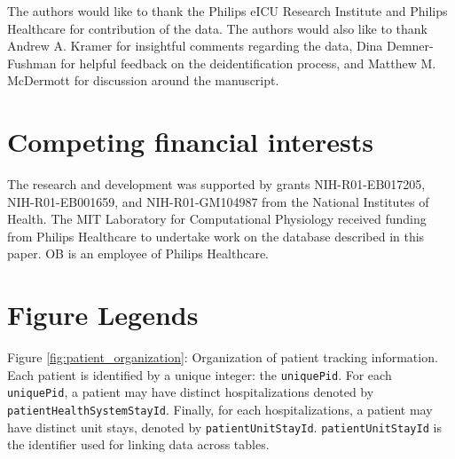 \documentclass[english]{article}
\newcommand{\colname}[1]{\texttt{#1}}
\begin{document}
The authors would like to thank the Philips eICU Research Institute and
Philips Healthcare for contribution of the data. The authors would also like to thank Andrew A. Kramer for insightful comments regarding the data, Dina Demner-Fushman for helpful feedback on the deidentification process, and Matthew M. McDermott for discussion around the manuscript.

\section*{Competing financial interests}\label{competing-interests}

The research and development was supported by grants NIH-R01-EB017205, NIH-R01-EB001659, and NIH-R01-GM104987 from the National Institutes of Health. The MIT Laboratory for Computational Physiology received funding from Philips Healthcare to undertake work on the database described in this paper. OB is an employee of Philips Healthcare.

\section*{Figure Legends}



\noindent
Figure \ref{fig:patient_organization}: Organization of patient tracking information. Each patient is identified by a unique integer: the \colname{uniquePid}. For each \colname{uniquePid}, a patient may have distinct hospitalizations denoted by \colname{patientHealthSystemStayId}. Finally, for each hospitalizations, a patient may have distinct unit stays, denoted by \colname{patientUnitStayId}. \colname{patientUnitStayId} is the identifier used for linking data across tables.\\
\end{document}
